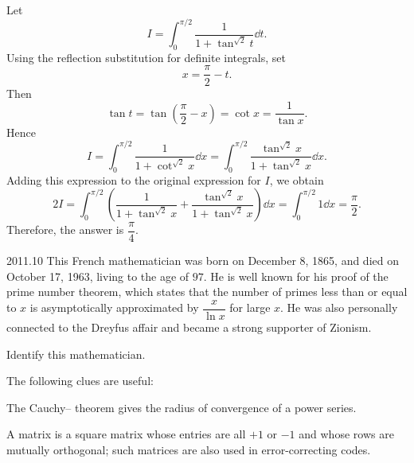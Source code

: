     \begin{solution}
        Let
        \[
            I
            =
            \int_0^{\pi/2}
            \frac{1}{1+\tan^{\sqrt{2}}t}\dd t.
        \]
        Using the reflection substitution for definite integrals, set
        \[
            x=\frac{\pi}{2}-t.
        \]
        Then
        \[
            \tan t
            =
            \tan\left(\frac{\pi}{2}-x\right)
            =
            \cot x
            =
            \frac{1}{\tan x}.
        \]
        Hence
        \[
            I
            =
            \int_0^{\pi/2}
            \frac{1}{1+\cot^{\sqrt{2}}x}\dd x
            =
            \int_0^{\pi/2}
            \frac{\tan^{\sqrt{2}}x}{1+\tan^{\sqrt{2}}x}\dd x.
        \]
        Adding this expression to the original expression for $I$, we obtain
        \[
            2I
            =
            \int_0^{\pi/2}
            \left(
                \frac{1}{1+\tan^{\sqrt{2}}x}
                +
                \frac{\tan^{\sqrt{2}}x}{1+\tan^{\sqrt{2}}x}
            \right)\dd x
            =
            \int_0^{\pi/2}1\dd x
            =
            \frac{\pi}{2}.
        \]
        Therefore, the answer is $\boxed{\dfrac{\pi}{4}}$.
    \end{solution}

    \begin{pastproblem}{2011.10}
        This French mathematician was born on December 8, 1865, and died on October 17, 1963, living
        to the age of $97$. He is well known for his proof of the prime number theorem, which states
        that the number of primes less than or equal to $x$ is asymptotically approximated by
        $\dfrac{x}{\ln x}$ for large $x$. He was also personally connected to the Dreyfus affair and
        became a strong supporter of Zionism.

        Identify this mathematician.

        \begin{hint}
            The following clues are useful:
            \begin{problemchoices}
                \item The Cauchy--\underline{\hspace{2cm}} theorem gives the radius of
                      convergence of a power series.
                \item A \underline{\hspace{2cm}} matrix is a square matrix whose entries are
                      all $+1$ or $-1$ and whose rows are mutually orthogonal; such matrices are also used in error-correcting codes.
            \end{problemchoices}
        \end{hint}
    \end{pastproblem}

